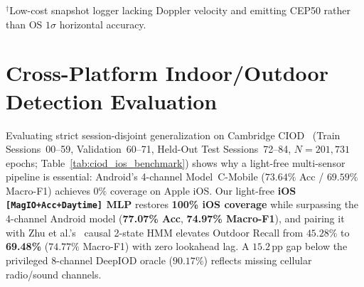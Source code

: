 \begin{table}[htbp]
\centering
\caption{Integrated Production \texttt{P01+P02} Benchmark on TU Wien Walks and SnapperGPS~2 Cycling.}
\label{tab:gnss_p01_p02_snapper}
\vspace{0.1cm}
\parbox{\textwidth}{\footnotesize $^\dagger$Low-cost snapshot logger lacking Doppler velocity and emitting CEP50 rather than OS $1\sigma$ horizontal accuracy.}
\end{table}

\section{Cross-Platform Indoor/Outdoor Detection Evaluation}
\label{sec:eval_iod_benchmark}
Evaluating strict session-disjoint generalization on Cambridge CIOD~\cite{bakirtzis2022ciod} (Train Sessions~00--59, Validation~60--71, Held-Out Test Sessions~72--84, $N = 201{,}731$ epochs; Table~\ref{tab:ciod_ios_benchmark}) shows why a light-free multi-sensor pipeline is essential: Android's 4-channel Model~C-Mobile ($73.64\%$ Acc / $69.59\%$ Macro-F1) achieves $0\%$ coverage on Apple iOS. Our light-free \textbf{iOS \texttt{[MagIO+Acc+Daytime]} MLP} restores \textbf{100\% iOS coverage} while surpassing the 4-channel Android model (\textbf{77.07\% Acc}, \textbf{74.97\% Macro-F1}), and pairing it with Zhu et al.'s~\cite{zhu2019fast} causal 2-state HMM elevates Outdoor Recall from $45.28\%$ to \textbf{69.48\%} ($74.77\%$ Macro-F1) with zero lookahead lag. A $15.2$\,pp gap below the privileged 8-channel DeepIOD oracle ($90.17\%$) reflects missing cellular radio/sound channels.

